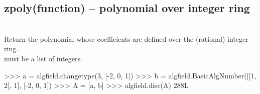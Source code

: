  \subsection{zpoly(function) -- polynomial over integer ring}
   \\
  \spacing
  \quad Return the polynomial whose coefficients  are defined over the (rational) integer ring.  \\
  \spacing
  \quad {} must be a list of integers.\\
%
\begin{ex}
>>> a = algfield.changetype(3, [-2, 0, 1])
>>> b = algfield.BasicAlgNumber([[1, 2], 1], [-2, 0, 1])
>>> A = [a, b]
>>> algfield.disc(A)
288L
\end{ex}%
\C



